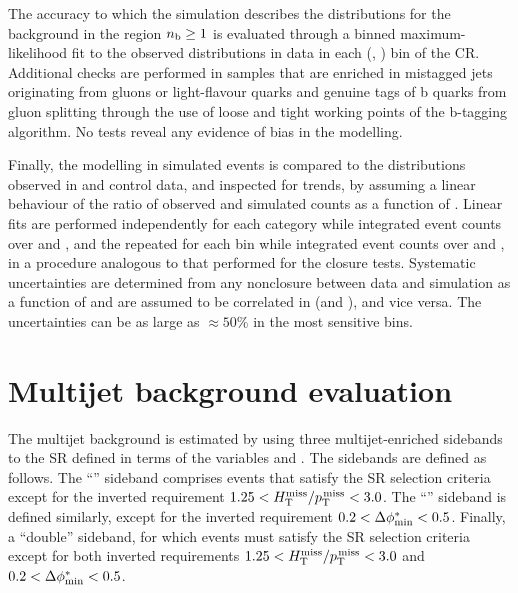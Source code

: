 The accuracy to which the simulation describes the \nb distributions
for the \znunuj background in the region $n_{\text{b}} \geq 1$ is evaluated
through a binned maximum-likelihood fit to the observed \nb
distributions in data in each (\njet, \scalht) bin of the \mmj
CR. Additional checks are performed in \mmj samples that are enriched
in mistagged jets originating from gluons or light-flavour quarks and
genuine tags of b quarks from gluon splitting through the use of loose
and tight working points of the b-tagging algorithm. No tests reveal
any evidence of bias in the \nb modelling.

Finally, the \mht modelling in simulated events is compared to the
distributions observed in \mj and \mmj control data, and inspected for
trends, by assuming a linear behaviour of the ratio of observed and
simulated counts as a function of \mht. Linear fits are performed
independently for each \njet category while integrated event counts
over \nb and \scalht, and the repeated for each \scalht bin while
integrated event counts over \njet and \nb, in a procedure analogous
to that performed for the closure tests. Systematic uncertainties are
determined from any nonclosure between data and simulation as a
function of \njet and are assumed to be correlated in \scalht (and
\nb), and vice versa. The uncertainties can be as large as
${\approx}50\%$ in the most sensitive \mht bins.


\section{Multijet background evaluation}
\label{sec:qcd}

The multijet background is estimated by using three multijet-enriched
sidebands to the SR defined in terms of the variables \mhtmet and
\bdphi. The sidebands are defined as follows. The ``\mhtmet'' sideband
comprises events that satisfy the SR selection criteria except for the
inverted requirement $1.25 < H_{\text{T}}^{\text{miss}} / p_{\text{T}}^{\kern1pt\text{miss}} < 3.0$. The ``\bdphi'' sideband
is defined similarly, except for the inverted requirement $0.2 <
\Delta\phi^{*}_\text{min} < 0.5$. Finally, a ``double'' sideband, for which events must
satisfy the SR selection criteria except for both inverted
requirements $1.25 < H_{\text{T}}^{\text{miss}} / p_{\text{T}}^{\kern1pt\text{miss}} < 3.0$ and $0.2 < \Delta\phi^{*}_\text{min} < 0.5$.

